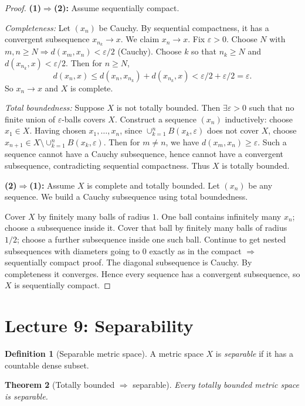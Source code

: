\documentclass[11pt]{article}
\newtheorem{theorem}{Theorem}[section]
\theoremstyle{definition}
\newtheorem{definition}[theorem]{Definition}
\newcommand{\eps}{\varepsilon}
\begin{document}
\begin{proof}
\textbf{(1)$\Rightarrow$(2):} Assume sequentially compact.

\emph{Completeness:} Let $(x_n)$ be Cauchy. By sequential compactness, it has a convergent subsequence $x_{n_k}\to x$.
We claim $x_n\to x$. Fix $\eps>0$. Choose $N$ with $m,n\ge N\Rightarrow d(x_m,x_n)<\eps/2$ (Cauchy).
Choose $k$ so that $n_k\ge N$ and $d(x_{n_k},x)<\eps/2$.
Then for $n\ge N$,
\[
d(x_n,x)\le d(x_n,x_{n_k})+d(x_{n_k},x)<\eps/2+\eps/2=\eps.
\]
So $x_n\to x$ and $X$ is complete.

\emph{Total boundedness:} Suppose $X$ is not totally bounded. Then $\exists \eps>0$ such that no finite union of $\eps$-balls covers $X$.
Construct a sequence $(x_n)$ inductively:
choose $x_1\in X$. Having chosen $x_1,\dots,x_n$, since $\cup_{k=1}^n B(x_k,\eps)$ does not cover $X$,
choose $x_{n+1}\in X\setminus \cup_{k=1}^n B(x_k,\eps)$.
Then for $m\ne n$, we have $d(x_m,x_n)\ge \eps$.
Such a sequence cannot have a Cauchy subsequence, hence cannot have a convergent subsequence, contradicting sequential compactness.
Thus $X$ is totally bounded.

\textbf{(2)$\Rightarrow$(1):} Assume $X$ is complete and totally bounded.
Let $(x_n)$ be any sequence. We build a Cauchy subsequence using total boundedness.

Cover $X$ by finitely many balls of radius $1$. One ball contains infinitely many $x_n$; choose a subsequence inside it.
Cover that ball by finitely many balls of radius $1/2$; choose a further subsequence inside one such ball.
Continue to get nested subsequences with diameters going to $0$ exactly as in the compact $\Rightarrow$ sequentially compact proof.
The diagonal subsequence is Cauchy. By completeness it converges.
Hence every sequence has a convergent subsequence, so $X$ is sequentially compact.
\end{proof}

\section{Lecture 9: Separability}

\begin{definition}[Separable metric space]
A metric space $X$ is \emph{separable} if it has a countable dense subset.
\end{definition}

\begin{theorem}[Totally bounded $\Rightarrow$ separable]
Every totally bounded metric space is separable.
\end{theorem}
\end{document}
